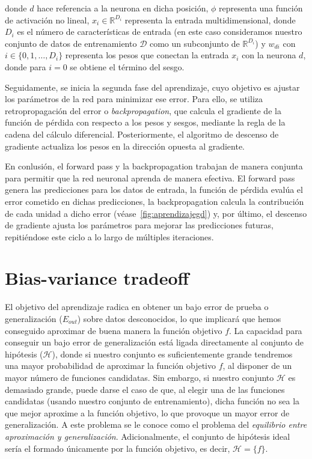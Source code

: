 donde $d$ hace referencia a la neurona en dicha posición, $\phi$ representa una función de activación no lineal, $x_i \in \mathbb{R}^{D_i}$ representa la entrada multidimensional, donde $D_i$ es el número de características de entrada (en este caso consideramos nuestro conjunto de datos de entrenamiento $\mathcal{D}$ como un subconjunto de $\mathbb{R}^{D_i}$) y $w_{di}$ con $i \in \{0,1,\ldots,D_i\}$ representa los pesos que conectan la entrada $x_i$ con la neurona $d$, donde para $i = 0$ se obtiene el término del sesgo.\newline

Seguidamente, se inicia la segunda fase del aprendizaje, cuyo objetivo es ajustar los parámetros de la red para minimizar ese error. Para ello, se utiliza retropropagación del error o \emph{backpropagation}, que calcula el gradiente de la función de pérdida con respecto a los pesos y sesgos, mediante la regla de la cadena del cálculo diferencial. Posteriormente, el algoritmo de descenso de gradiente actualiza los pesos en la dirección opuesta al gradiente.\newline

En conlusión, el forward pass y la backpropagation trabajan de manera conjunta para permitir que la red neuronal aprenda de manera efectiva. El forward pass genera las predicciones para los datos de entrada, la función de pérdida evalúa el error cometido en dichas predicciones, la backpropagation calcula la contribución de cada unidad a dicho error (véase~\autoref{fig:aprendizajegd}) y, por último, el descenso de gradiente ajusta los parámetros para mejorar las predicciones futuras, repitiéndose este ciclo a lo largo de múltiples iteraciones.\newline

\section{Bias-variance tradeoff}\label{sec:capitulo-bias-variance-tradeoff}
El objetivo del aprendizaje radica en obtener un bajo error de prueba o generalización ($E_{out}$) sobre datos desconocidos, lo que implicará que hemos conseguido aproximar de buena manera la función objetivo $f$. La capacidad para conseguir un bajo error de generalización está ligada directamente al conjunto de hipótesis ($\mathcal{H}$), donde si nuestro conjunto es suficientemente grande tendremos una mayor probabilidad de aproximar la función objetivo $f$, al disponer de un mayor número de funciones candidatas. Sin embargo, si nuestro conjunto $\mathcal{H}$ es demasiado grande, puede darse el caso de que, al elegir una de las funciones candidatas (usando nuestro conjunto de entrenamiento), dicha función no sea la que mejor aproxime a la función objetivo, lo que provoque un mayor error de generalización. A este problema se le conoce como el problema del \textit{equilibrio entre aproximación y generalización}. Adicionalmente, el conjunto de hipótesis ideal sería el formado únicamente por la función objetivo, es decir, $\mathcal{H} = \{f\}$.\newline

